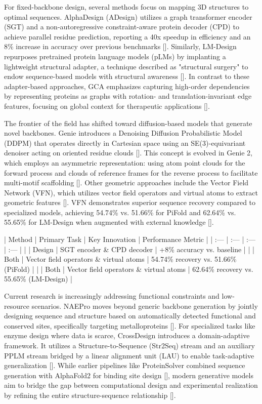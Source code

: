 \documentclass[11pt]{article}
\begin{document}
For fixed-backbone design, several methods focus on mapping 3D structures to optimal sequences. AlphaDesign (ADesign) utilizes a graph transformer encoder (SGT) and a non-autoregressive constraint-aware protein decoder (CPD) to achieve parallel residue prediction, reporting a 40x speedup in efficiency and an 8\% increase in accuracy over previous benchmarks [\citep{2202.01079}]. Similarly, LM-Design repurposes pretrained protein language models (pLMs) by implanting a lightweight structural adapter, a technique described as "structural surgery" to endow sequence-based models with structural awareness [\citep{2302.01649}]. In contrast to these adapter-based approaches, GCA emphasizes capturing high-order dependencies by representing proteins as graphs with rotation- and translation-invariant edge features, focusing on global context for therapeutic applications [\citep{2204.10673}].

The frontier of the field has shifted toward diffusion-based models that generate novel backbones. Genie introduces a Denoising Diffusion Probabilistic Model (DDPM) that operates directly in Cartesian space using an SE(3)-equivariant denoiser acting on oriented residue clouds [\citep{2301.12485}]. This concept is evolved in Genie 2, which employs an asymmetric representation: using atom point clouds for the forward process and clouds of reference frames for the reverse process to facilitate multi-motif scaffolding [\citep{2405.15489}]. Other geometric approaches include the Vector Field Network (VFN), which utilizes vector field operators and virtual atoms to extract geometric features [\citep{2310.11802}]. VFN demonstrates superior sequence recovery compared to specialized models, achieving 54.74\% vs. 51.66\% for PiFold and 62.64\% vs. 55.65\% for LM-Design when augmented with external knowledge [\citep{2310.11802}].

| Method | Primary Task | Key Innovation | Performance Metric |
| :--- | :--- | :--- | :--- |
| \citep{2202.01079} | Design | SGT encoder \& CPD decoder | +8\% accuracy vs. baseline |
| \citep{2310.11802} | Both | Vector field operators \& virtual atoms | 54.74\% recovery vs. 51.66\% (PiFold) |
| \citep{2310.11802} | Both | Vector field operators \& virtual atoms | 62.64\% recovery vs. 55.65\% (LM-Design) |

Current research is increasingly addressing functional constraints and low-resource scenarios. NAEPro moves beyond generic backbone generation by jointly designing sequence and structure based on automatically detected functional and conserved sites, specifically targeting metalloproteins [\citep{2310.04343}]. For specialized tasks like enzyme design where data is scarce, CrossDesign introduces a domain-adaptive framework. It utilizes a Structure-to-Sequence (Str2Seq) stream and an auxiliary PPLM stream bridged by a linear alignment unit (LAU) to enable task-adaptive generalization [\citep{2411.17795}]. While earlier pipelines like ProteinSolver combined sequence generation with AlphaFold2 for binding site design [\citep{2208.14526}], modern generative models aim to bridge the gap between computational design and experimental realization by refining the entire structure-sequence relationship [\citep{2408.17241}].
\end{document}
